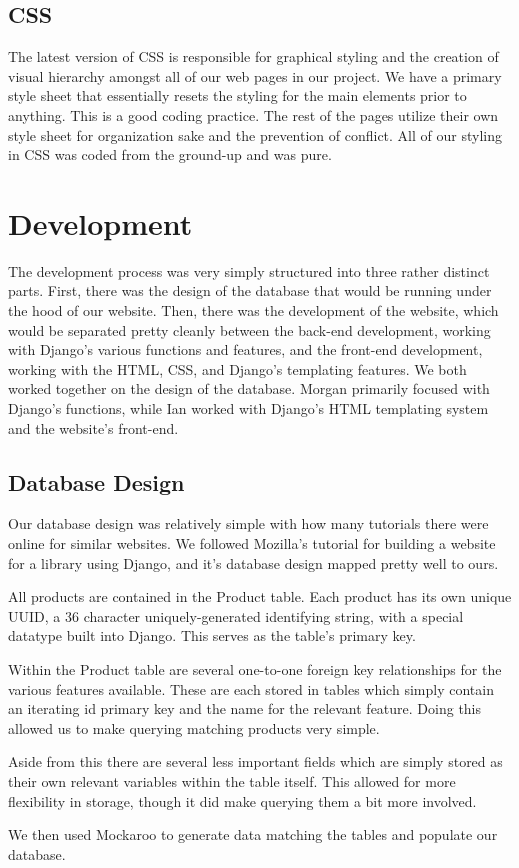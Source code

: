 \documentclass[sigconf]{acmart}
\begin{document}
\subsection{CSS}
The latest version of CSS is responsible for graphical styling and the creation of visual hierarchy amongst all of our web pages in our project. We have a primary style sheet that essentially resets the styling for the main elements prior to anything. This is a good coding practice. The rest of the pages utilize their own style sheet for organization sake and the prevention of conflict. All of our styling in CSS was coded from the ground-up and was pure.


\section{Development}\label{development}
The development process was very simply structured into three rather distinct parts. First, there was the design of the database that would be running under the hood of our website. Then, there was the development of the website, which would be separated pretty cleanly between the back-end development, working with Django's various functions and features, and the front-end development, working with the HTML, CSS, and Django's templating features. We both worked together on the design of the database. Morgan primarily focused with Django's functions, while Ian worked with Django's HTML templating system and the website's front-end.

\subsection{Database Design}\label{database}
Our database design was relatively simple with how many tutorials there were online for similar websites. We followed Mozilla's tutorial for building a website for a library using Django, and it's database design mapped pretty well to ours. \par
All products are contained in the Product table. Each product has its own unique UUID, a 36 character uniquely-generated identifying string, with a special datatype built into Django. This serves as the table's primary key. \par
Within the Product table are several one-to-one foreign key relationships for the various features available. These are each stored in tables which simply contain an iterating id primary key and the name for the relevant feature. Doing this allowed us to make querying matching products very simple. \par
\pagebreak
Aside from this there are several less important fields which are simply stored as their own relevant variables within the table itself. This allowed for more flexibility in storage, though it did make querying them a bit more involved. \par
We then used Mockaroo to generate data matching the tables and populate our database.
\end{document}
